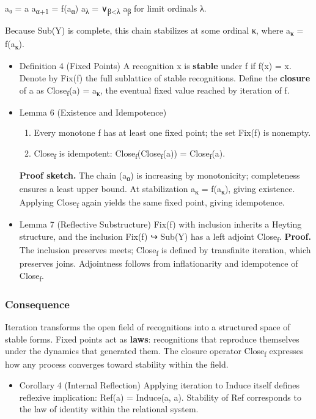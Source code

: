 \documentclass[11pt]{article}
\begin{document}
a₀ = a  
a\textsubscript{α+1} = f(a\textsubscript{α})  
a\textsubscript{λ} = ∨\textsubscript{β<λ} a\textsubscript{β}  for limit ordinals λ.

Because Sub(Y) is complete, this chain stabilizes at some ordinal κ, where a\textsubscript{κ} = f(a\textsubscript{κ}).
\begin{itemize}
\item Definition 4 (Fixed Points)
\label{sec:org9805183}
A recognition x is \textbf{stable} under f if f(x) = x.  
Denote by Fix(f) the full sublattice of stable recognitions.  
Define the \textbf{closure} of a as  Close\textsubscript{f}(a) = a\textsubscript{κ},  the eventual fixed value reached by iteration of f.
\item Lemma 6 (Existence and Idempotence)
\label{sec:org4533153}
\begin{enumerate}
\item Every monotone f has at least one fixed point; the set Fix(f) is nonempty.
\item Close\textsubscript{f} is idempotent: Close\textsubscript{f}(Close\textsubscript{f}(a)) = Close\textsubscript{f}(a).
\end{enumerate}
\textbf{Proof sketch.}  The chain (a\textsubscript{α}) is increasing by monotonicity; completeness ensures a least upper bound.  
At stabilization a\textsubscript{κ} = f(a\textsubscript{κ}), giving existence.  
Applying Close\textsubscript{f} again yields the same fixed point, giving idempotence.
\item Lemma 7 (Reflective Substructure)
\label{sec:orgfb7185b}
Fix(f) with inclusion inherits a Heyting structure, and the inclusion Fix(f) ↪ Sub(Y) has a left adjoint Close\textsubscript{f}.  
\textbf{Proof.}  The inclusion preserves meets; Close\textsubscript{f} is defined by transfinite iteration, which preserves joins.  
Adjointness follows from inflationarity and idempotence of Close\textsubscript{f}.
\end{itemize}
\subsubsection*{Consequence}
\label{sec:org3b967f4}
Iteration transforms the open field of recognitions into a structured space of stable forms.  
Fixed points act as \textbf{laws}: recognitions that reproduce themselves under the dynamics that generated them.  
The closure operator Close\textsubscript{f} expresses how any process converges toward stability within the field.
\begin{itemize}
\item Corollary 4 (Internal Reflection)
\label{sec:org099e67d}
Applying iteration to Induce itself defines reflexive implication:
Ref(a) = Induce(a, a).  
Stability of Ref corresponds to the law of identity within the relational system.
\end{itemize}
\end{document}
